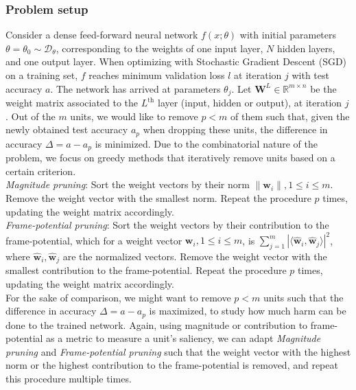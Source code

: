 \subsubsection*{Problem setup}
Consider a dense feed-forward neural network $f(x; \theta)$ with initial parameters $\theta = \theta_0 \sim \mathcal{D}_{\theta}$, corresponding to the weights of one input layer, $N$ hidden layers, and one output layer. When optimizing with Stochastic Gradient Descent (SGD) on a training set, $f$ reaches minimum validation loss $l$ at iteration $j$ with test accuracy $a$. The network has arrived at parameters $\theta_j$. Let $\mathbf{W}^L \in \mathbb{R}^{m \times n}$ be the weight matrix associated to the $L^{\text{th}}$ layer (input, hidden or output), at iteration $j$. Out of the $m$ units, we would like to remove $p < m$ of them such that, given the newly obtained test accuracy $a_p$ when dropping these units, the difference in accuracy $\Delta = a - a_p$ is minimized. Due to the combinatorial nature of the problem, we focus on greedy methods that iteratively remove units based on a certain criterion.  \\

\textit{Magnitude pruning}: Sort the weight vectors by their norm $\|\mathbf{w}_i\|, 1 \leq i \leq m$. Remove the weight vector with the smallest norm. Repeat the procedure $p$ times, updating the weight matrix accordingly. \\

\textit{Frame-potential pruning}: Sort the weight vectors by their contribution to the frame-potential, which for a weight vector $\mathbf{w}_i, 1 \leq i \leq m$, is $\sum\limits_{j=1}^m | \langle \hat{\mathbf{w}}_i, \hat{\mathbf{w}}_j \rangle |^2$, where $\hat{\mathbf{w}}_i, \hat{\mathbf{w}}_j$ are the normalized vectors. Remove the weight vector with the smallest contribution to the frame-potential. Repeat the procedure $p$ times, updating the weight matrix accordingly. \\

For the sake of comparison, we might want to remove $p < m$ units such that the difference in accuracy $\Delta = a - a_p$ is maximized, to study how much harm can be done to the trained network. Again, using magnitude or contribution to frame-potential as a metric to measure a unit's saliency, we can adapt \textit{Magnitude pruning} and \textit{Frame-potential pruning} such that the weight vector with the highest norm or the highest contribution to the frame-potential is removed, and repeat this procedure multiple times. \\

